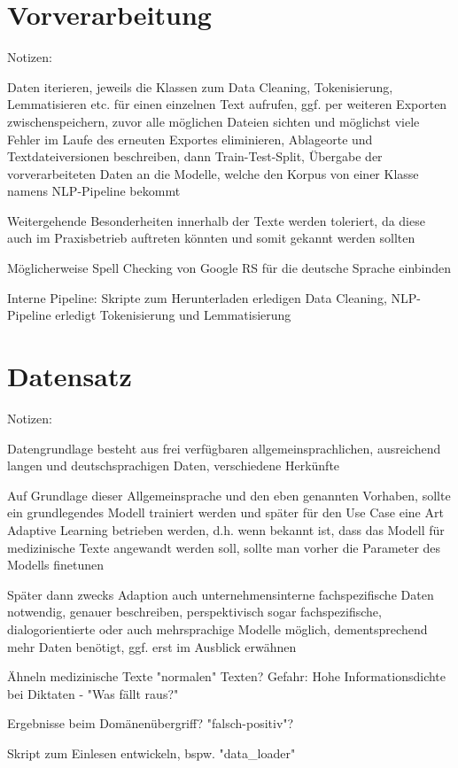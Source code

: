 \section{Vorverarbeitung}
Notizen:
	\item Daten iterieren, jeweils die Klassen zum Data Cleaning, Tokenisierung, Lemmatisieren etc. für einen einzelnen Text aufrufen, ggf. per weiteren Exporten zwischenspeichern, zuvor alle möglichen Dateien sichten und möglichst viele Fehler im Laufe des erneuten Exportes eliminieren, Ablageorte und Textdateiversionen beschreiben, dann Train-Test-Split, Übergabe der vorverarbeiteten Daten an die Modelle, welche den Korpus von einer Klasse namens NLP-Pipeline bekommt
	\item Weitergehende Besonderheiten innerhalb der Texte werden toleriert, da diese auch im Praxisbetrieb auftreten könnten und somit gekannt werden sollten
	\item Möglicherweise Spell Checking von Google RS für die deutsche Sprache einbinden
	\item Interne Pipeline: Skripte zum Herunterladen erledigen Data Cleaning, NLP-Pipeline erledigt Tokenisierung und Lemmatisierung


\section{Datensatz}
Notizen:
	\item Datengrundlage besteht aus frei verfügbaren allgemeinsprachlichen, ausreichend langen und deutschsprachigen Daten, verschiedene Herkünfte
	\item Auf Grundlage dieser Allgemeinsprache und den eben genannten Vorhaben, sollte ein grundlegendes Modell trainiert werden und später für den Use Case eine Art Adaptive Learning betrieben werden, d.h. wenn bekannt ist, dass das Modell für medizinische Texte angewandt werden soll, sollte man vorher die Parameter des Modells finetunen
	\item Später dann zwecks Adaption auch unternehmensinterne fachspezifische Daten notwendig, genauer beschreiben, perspektivisch sogar fachspezifische, dialogorientierte oder auch mehrsprachige Modelle möglich, dementsprechend mehr Daten benötigt, ggf. erst im Ausblick erwähnen
	\item Ähneln medizinische Texte "normalen" Texten? Gefahr: Hohe Informationsdichte bei Diktaten - "Was fällt raus?"
	\item Ergebnisse beim Domänenübergriff? "falsch-positiv"?
	\item Skript zum Einlesen entwickeln, bspw. "data_loader"
